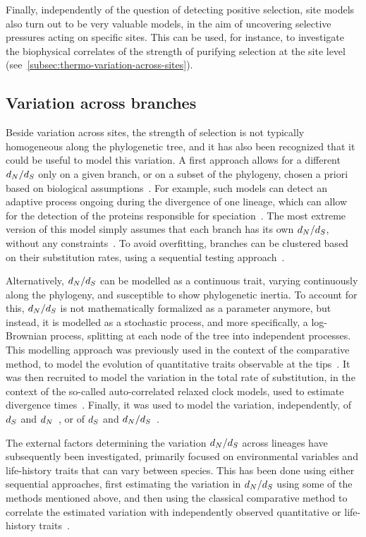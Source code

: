 Finally, independently of the question of detecting positive selection, site models also turn out to be very valuable models, in the aim of uncovering selective pressures acting on specific sites.
This can be used, for instance, to investigate the biophysical correlates of the strength of purifying selection at the site level (see~\ref{subsec:thermo-variation-across-sites}).

\subsection{Variation across branches}
\label{subsec:variation-across-branches}

Beside variation across sites, the strength of selection is not typically homogeneous along the phylogenetic tree, and it has also been recognized that it could be useful to model this variation.
A first approach allows for a different $d_N / d_S$ only on a given branch, or on a subset of the phylogeny, chosen a priori based on biological assumptions~\citep{Yang1998}.
For example, such models can detect an adaptive process ongoing during the divergence of one lineage, which can allow for the detection of the proteins responsible for speciation~\citep{Yang1998, Zhang2004}.
The most extreme version of this model simply assumes that each branch has its own $d_N / d_S$, without any constraints~\citep{Popadin2007}.
To avoid overfitting, branches can be clustered based on their substitution rates, using a sequential testing approach~\citep{Dutheil2012}.

Alternatively, $d_N / d_S$ can be modelled as a continuous trait, varying continuously along the phylogeny, and susceptible to show phylogenetic inertia.
To account for this, $d_N / d_S$ is not mathematically formalized as a parameter anymore, but instead, it is modelled as a stochastic process, and more specifically, a log-Brownian process, splitting at each node of the tree into independent processes.
This modelling approach was previously used in the context of the comparative method, to model the evolution of quantitative traits observable at the tips~\citep{Felsenstein1985, Huelsenbeck2003}.
It was then recruited to model the variation in the total rate of substitution, in the context of the so-called auto-correlated relaxed clock models, used to estimate divergence times~\citep{Thorne1998}.
Finally, it was used to model the variation, independently, of $d_S$ and $d_N$~\citep{Seo2004}, or of $d_S$ and $d_N / d_S$~\citep{Lartillot2011}.

The external factors determining the variation $d_N / d_S$ across lineages have subsequently been investigated, primarily focused on environmental variables and life-history traits that can vary between species.
This has been done using either sequential approaches, first estimating the variation in $d_N / d_S$ using some of the methods mentioned above, and then using the classical comparative method to correlate the estimated variation with independently observed quantitative or life-history traits~\citep{Popadin2007, Lanfear2010, Romiguier2014}.

